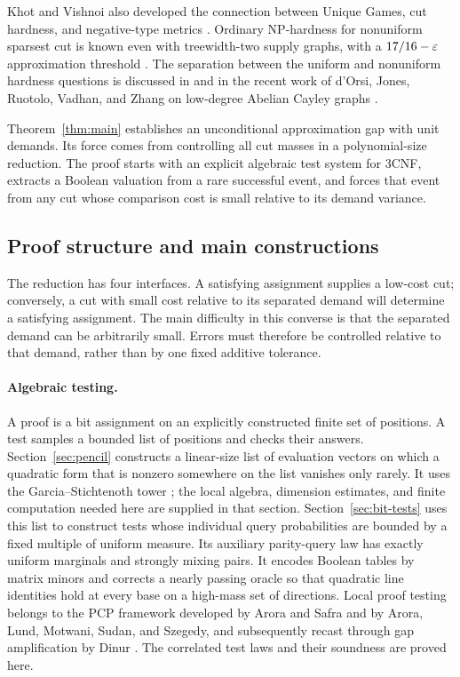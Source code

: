 Khot and Vishnoi also developed the connection between Unique Games,
cut hardness, and negative-type metrics \cite{KhotVishnoi2015}.
Ordinary NP-hardness for nonuniform sparsest cut is known even with
treewidth-two supply graphs, with a $17/16-\varepsilon$ approximation threshold
\cite[Theorem~1.3]{GuptaTalwarWitmer2013}. The separation between the
uniform and nonuniform
hardness questions is discussed in
\cite[Section~1.2]{ManurangsiTrevisan2018} and in the recent work of
d'Orsi, Jones, Ruotolo, Vadhan, and Zhang on low-degree Abelian Cayley
graphs \cite{DOrsiEtAl2025}.

Theorem~\ref{thm:main} establishes an unconditional approximation gap with
unit demands.  Its force comes from controlling all cut masses in a
polynomial-size reduction.  The proof starts with an explicit algebraic
test system for $3$CNF, extracts a Boolean valuation from a rare successful
event, and forces that event from any cut whose comparison cost is small
relative to its demand variance.

\subsection{Proof structure and main constructions}

The reduction has four interfaces. A satisfying assignment supplies a
low-cost cut; conversely, a cut with small cost relative to its separated
demand will determine a satisfying assignment. The main difficulty in
this converse is that the separated demand can be arbitrarily small.
Errors must therefore be controlled relative to that demand, rather than
by one fixed additive tolerance.

\paragraph{Algebraic testing.}
A proof is a bit assignment on an explicitly constructed finite set of
positions. A test samples a bounded list of positions and checks their
answers. Section~\ref{sec:pencil} constructs a linear-size list of
evaluation vectors on which a quadratic form that is nonzero somewhere
on the list vanishes only rarely. It uses the Garcia--Stichtenoth tower
\cite{GS1996,Stichtenoth2001}; the local algebra, dimension estimates,
and finite computation needed here are supplied in that section.
Section~\ref{sec:bit-tests} uses this list to construct tests whose
individual query probabilities are bounded by a fixed multiple of uniform
measure. Its auxiliary parity-query law has exactly uniform marginals
and strongly mixing pairs. It encodes Boolean tables by matrix minors and
corrects a nearly passing oracle so that quadratic line identities hold
at every base on a high-mass set of directions. Local proof testing
belongs to the PCP framework developed by Arora and Safra and by Arora,
Lund, Motwani, Sudan, and Szegedy, and subsequently recast through gap
amplification by Dinur \cite{AroraSafra1998,ALMSS1998,Dinur2007}.
The correlated test laws and their soundness are proved here.

